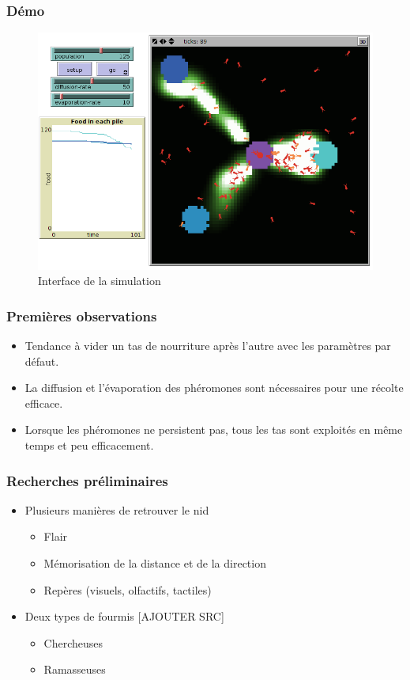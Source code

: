 \documentclass[11pt]{beamer}
\begin{document}
\begin{frame}
\frametitle{Démo}
\begin{figure}
\includegraphics[scale=0.3]{Capture2.png}
\caption{Interface de la simulation}
\end{figure}
\end{frame}

\begin{frame}
\frametitle{Premières observations}
\begin{itemize}
\item Tendance à vider un tas de nourriture après l'autre avec les paramètres par défaut.
\item La diffusion et l'évaporation des phéromones sont nécessaires pour une récolte efficace.
\item Lorsque les phéromones ne persistent pas, tous les tas sont exploités en même temps et peu efficacement.
\end{itemize}
\end{frame}

\begin{frame}
\frametitle{Recherches préliminaires}
\begin{itemize}
\item Plusieurs manières de retrouver le nid
\begin{itemize}
\item Flair
\item Mémorisation de la distance et de la direction
\item Repères (visuels, olfactifs, tactiles)
\end{itemize}
\item Deux types de fourmis [AJOUTER SRC]
\begin{itemize}
\item Chercheuses
\item Ramasseuses
\end{itemize}
\end{itemize}
\end{frame}
\end{document}
